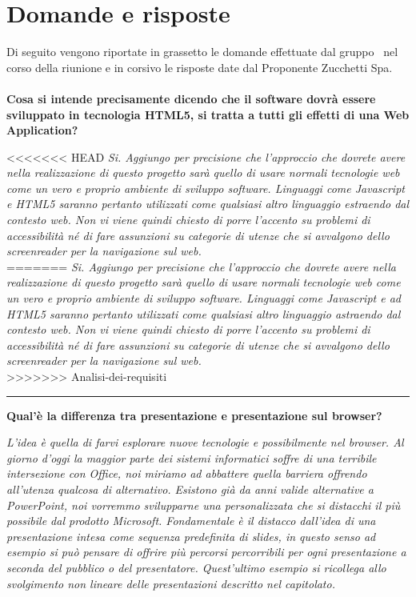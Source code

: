 \newenvironment{margini}[2]
{
	\begin{list}{} {
			\setlength{\leftmargin}{#1}
			\setlength{\rightmargin}{#2}
		} \item }
	{\end{list}}

\section{Domande e risposte}
Di seguito vengono riportate in grassetto le domande effettuate dal gruppo \gruppo\ nel corso della riunione e in corsivo le risposte date dal Proponente Zucchetti Spa.\\
\\\textbf{Cosa si intende precisamente dicendo che il software dovrà essere sviluppato in tecnologia HTML5, si tratta a tutti gli effetti di una Web Application?}\\
\begin{margini}{0.7cm}{0.7cm}
<<<<<<< HEAD
\textit{Si.  Aggiungo per  precisione che l'approccio che dovrete avere nella realizzazione di questo progetto sarà quello di usare normali tecnologie web come un vero e proprio ambiente di sviluppo software. Linguaggi come Javascript e HTML5 saranno pertanto utilizzati come qualsiasi altro linguaggio estraendo dal contesto web. Non vi viene quindi chiesto di porre l'accento su problemi di accessibilità né di fare assunzioni su categorie di utenze che si avvalgono dello screenreader per la navigazione sul web.}\\
=======
\textit{Si.  Aggiungo per  precisione che l'approccio che dovrete avere nella realizzazione di questo progetto sarà quello di usare normali tecnologie web come un vero e proprio ambiente di sviluppo software. Linguaggi come Javascript e ad HTML5 saranno pertanto utilizzati come qualsiasi altro linguaggio astraendo dal contesto web. Non vi viene quindi chiesto di porre l'accento su problemi di accessibilità né di fare assunzioni su categorie di utenze che si avvalgono dello screenreader per la navigazione sul web.}\\
>>>>>>> Analisi-dei-requisiti
\end{margini}
\hrule
\bigskip
\textbf{Qual'è la differenza tra presentazione e presentazione sul browser?}\\
\begin{margini}{0.7cm}{0.7cm}
	\textit{L'idea è quella di farvi esplorare nuove tecnologie e possibilmente nel browser. Al giorno d'oggi la maggior parte dei sistemi informatici soffre di una terribile intersezione con Office, noi miriamo ad abbattere quella barriera offrendo all'utenza qualcosa di alternativo. Esistono già da anni valide alternative a PowerPoint, noi vorremmo svilupparne una personalizzata che si distacchi il più possibile dal prodotto Microsoft. Fondamentale è il distacco dall'idea di una presentazione intesa come sequenza predefinita di slides, in questo senso ad esempio si può pensare di offrire più percorsi percorribili per ogni presentazione a seconda del pubblico o del presentatore. Quest'ultimo esempio si ricollega allo svolgimento non lineare delle presentazioni descritto nel capitolato.}\\
\end{margini}
